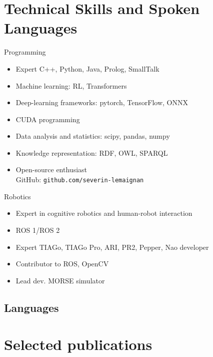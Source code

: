 \documentclass[10pt,a4paper]{moderncv}        %
\begin{document}
\section{Technical Skills and Spoken Languages}

\cvcomputer
    {Programming}{
        \begin{itemize}
        \item Expert C++, Python, Java, Prolog, SmallTalk
        \item Machine learning: RL, Transformers
        \item Deep-learning frameworks: pytorch, TensorFlow, ONNX
        \item CUDA programming
        \item Data analysis and statistics: scipy, pandas, numpy
        \item Knowledge representation: RDF, OWL, SPARQL
        \item Open-source enthusiast\\ GitHub: \texttt{github.com/severin-lemaignan}
        \end{itemize}
        }
    {Robotics}{
        \begin{itemize}
            \item Expert in cognitive robotics and human-robot interaction
            \item ROS 1/ROS 2
            \item Expert TIAGo, TIAGo Pro, ARI, PR2, Pepper, Nao developer
            \item Contributor to ROS, OpenCV
            \item Lead dev. MORSE simulator
        \end{itemize}
        }

\subsection{Languages}


\section{Selected publications}
\end{document}

